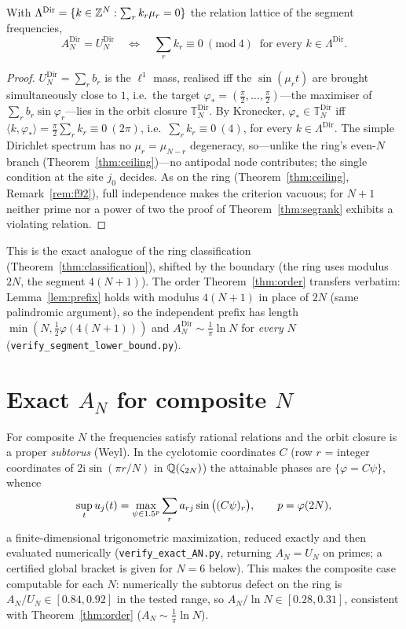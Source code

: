 \begin{corollary}\label{cor:segceiling}
With $\Lambda^{\mathrm{Dir}}=\{k\in\mathbb{Z}^N:\sum_r k_r\mu_r=0\}$ the relation lattice of the segment frequencies,
\[
  A_N^{\mathrm{Dir}}=U_N^{\mathrm{Dir}}\quad\Longleftrightarrow\quad
  \sum_r k_r\equiv0\ (\mathrm{mod}\ 4)\ \text{ for every }k\in\Lambda^{\mathrm{Dir}}.
\]
\end{corollary}
\begin{proof}
$U_N^{\mathrm{Dir}}=\sum_r b_r$ is the $\ell^1$ mass, realised iff the $\sin(\mu_r t)$ are brought
simultaneously close to $1$, i.e.\ the target $\varphi_\ast=(\tfrac\pi2,\dots,\tfrac\pi2)$---the maximiser of
$\sum_r b_r\sin\varphi_r$---lies in the orbit closure $\mathbb T_N^{\mathrm{Dir}}$. By Kronecker,
$\varphi_\ast\in\mathbb T_N^{\mathrm{Dir}}$ iff $\langle k,\varphi_\ast\rangle=\tfrac\pi2\sum_r k_r\equiv0\
(2\pi)$, i.e.\ $\sum_r k_r\equiv0\ (4)$, for every $k\in\Lambda^{\mathrm{Dir}}$. The simple Dirichlet
spectrum has no $\mu_r=\mu_{N-r}$ degeneracy, so---unlike the ring's even-$N$ branch
(Theorem~\ref{thm:ceiling})---no antipodal node contributes; the single condition at the site $j_0$ decides.
As on the ring (Theorem~\ref{thm:ceiling}, Remark~\ref{rem:f92}), full independence makes the criterion vacuous;
for $N+1$ neither prime nor a power of two the proof of Theorem~\ref{thm:segrank} exhibits a violating relation.
\end{proof}

\noindent This is the exact analogue of the ring classification (Theorem~\ref{thm:classification}), shifted
by the boundary (the ring uses modulus $2N$, the segment $4(N+1)$). The order Theorem~\ref{thm:order}
transfers verbatim: Lemma~\ref{lem:prefix} holds with modulus $4(N+1)$ in place of $2N$ (same
palindromic argument), so the independent prefix has length $\min(N,\tfrac12\varphi(4(N+1)))$ and
$A_N^{\mathrm{Dir}}\sim\tfrac1\pi\ln N$ for \emph{every} $N$ (\texttt{verify\_segment\_lower\_bound.py}).

\section{Exact \texorpdfstring{$A_N$}{A\_N} for composite \texorpdfstring{$N$}{N}}\label{sec:exact}

For composite $N$ the frequencies satisfy rational relations and the orbit closure is a proper
\emph{subtorus} (Weyl). In the cyclotomic coordinates $C$ (row $r$ = integer coordinates of
$2\mathrm{i}\sin(\pi r/N)$ in $\mathbb{Q}(\zeta_{2N})$) the attainable phases are $\{\varphi=C\psi\}$, whence
\begin{equation}\label{eq:subtorus}
  \sup_t u_j(t)=\max_{\psi\in1.5^p}\sum_r a_{rj}\sin\big((C\psi)_r\big),\qquad p=\varphi(2N),
\end{equation}
a finite-dimensional trigonometric maximization, reduced exactly and then evaluated numerically
(\texttt{verify\_exact\_AN.py}, returning $A_N=U_N$ on primes; a certified global bracket is given for
$N=6$ below). This makes the composite case computable for each $N$:
numerically the subtorus defect on the ring is $A_N/U_N\in[0.84,0.92]$ in the tested range, so
$A_N/\ln N\in[0.28,0.31]$, consistent with Theorem~\ref{thm:order} ($A_N\sim\tfrac1\pi\ln N$).

